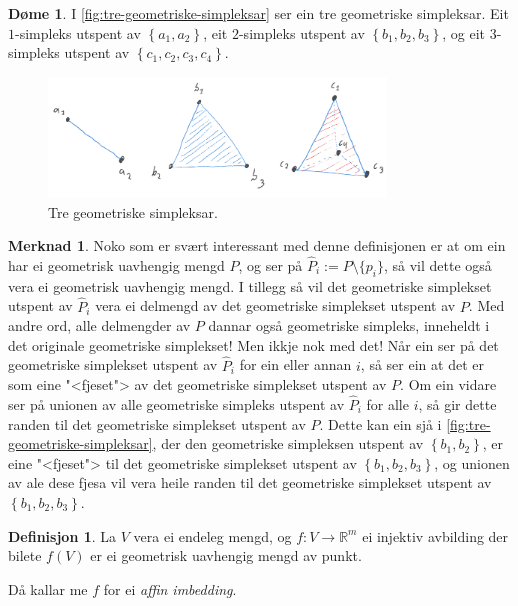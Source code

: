 \documentclass[a4paper, 12pt, norsk]{article}
\theoremstyle{plain}
\theoremstyle{definition}
\newtheorem{definition}[theorem]{Definisjon}
\newtheorem{example}[theorem]{Døme}
\newtheorem{remark}[theorem]{Merknad}
\newcommand{\Rb}{\mathbb{R}}
\newcommand{\set}[1]{ \left\{ #1 \right\} } %
\begin{document}
\begin{example}
	 I \autoref{fig:tre-geometriske-simpleksar} ser ein tre geometriske simpleksar. Eit \( 1 \)-simpleks utspent av \( \set{a_1, a_2} \), eit \(2\)-simpleks utspent av \( \set{b_1, b_2, b_3} \), og eit \(3\)-simpleks utspent av \( \set{c_1, c_2, c_3, c_4} \).
	\begin{figure}[htbp]
		\begin{center}
			\includegraphics[width=0.8\textwidth]{png/Eksempel1-8.png}
			\caption{Tre geometriske simpleksar.}
			\label{fig:tre-geometriske-simpleksar}
		\end{center}
	\end{figure}
\end{example}

\begin{remark}
	Noko som er svært interessant med denne definisjonen er at om ein har ei geometrisk uavhengig mengd $P$, og ser på $\hat{P}_i := P \setminus \{p_i\}$, så vil dette også vera ei geometrisk uavhengig mengd. I tillegg så vil det geometriske simplekset utspent av $\hat{P}_i$ vera ei delmengd av det geometriske simplekset utspent av $P$. Med andre ord, alle delmengder av $P$ dannar også geometriske simpleks, inneheldt i det originale geometriske simplekset! Men ikkje nok med det! Når ein ser på det geometriske simplekset utspent av $\hat{P}_i$ for ein eller annan $i$, så ser ein at det er som eine "<fjeset"> av det geometriske simplekset utspent av $P$. Om ein vidare ser på unionen av alle geometriske simpleks utspent av \( \hat{P}_i \) for alle \( i \), så gir dette randen til det geometriske simplekset utspent av \( P \). Dette kan ein sjå i \autoref{fig:tre-geometriske-simpleksar}, der den geometriske simpleksen utspent av \( \set{b_1, b_2} \), er eine "<fjeset"> til det geometriske simplekset utspent av \( \set{b_1, b_2, b_3} \), og unionen av ale dese fjesa vil vera heile randen til det geometriske simplekset utspent av \( \set{b_1, b_2, b_3} \).
\end{remark}

\begin{definition}
	La $V$ vera ei endeleg mengd, og $f:V\rightarrow \Rb^m$ ei injektiv avbilding der bilete $f(V)$ er ei geometrisk uavhengig mengd av punkt. 
	
	Då kallar me \( f \) for ei \emph{affin imbedding}.
\end{definition}
\end{document}
